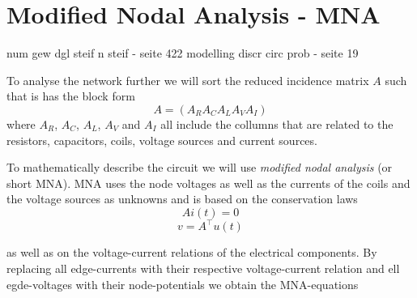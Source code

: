 \section{Modified Nodal Analysis - MNA}

num gew dgl steif n steif - seite 422 \newline
modelling discr circ prob - seite 19

To analyse the network further we will sort the reduced incidence matrix $A$ such that is has the block form
\begin{displaymath}
	A = (A_R A_C A_L A_V A_I)
\end{displaymath}
where $A_R$, $A_C$, $A_L$, $A_V$ and $A_I$ all include the collumns that are related to the resistors, capacitors, coils, voltage sources and current sources. 

To mathematically describe the circuit we will use \emph{modified nodal analysis} (or short MNA). MNA uses the node voltages as well as the currents of the coils and the voltage sources as unknowns and is based on the conservation laws
\begin{equation}
	\label{KCL}
	Ai(t) = 0 
\end{equation}
\begin{equation}
	\label{KVL}
	v = A^\top u(t)
\end{equation}

as well as on the voltage-current relations of the electrical components. By replacing all edge-currents with their respective voltage-current relation and ell egde-voltages with their node-potentials we obtain the MNA-equations

